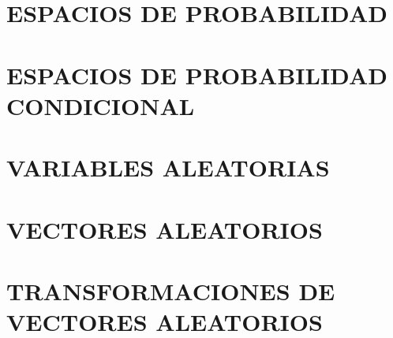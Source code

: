 
\chapter{ESPACIOS DE PROBABILIDAD}
\chapter{ESPACIOS DE PROBABILIDAD CONDICIONAL}
\chapter{VARIABLES ALEATORIAS}
\chapter{VECTORES ALEATORIOS}
\chapter{TRANSFORMACIONES DE VECTORES ALEATORIOS}
